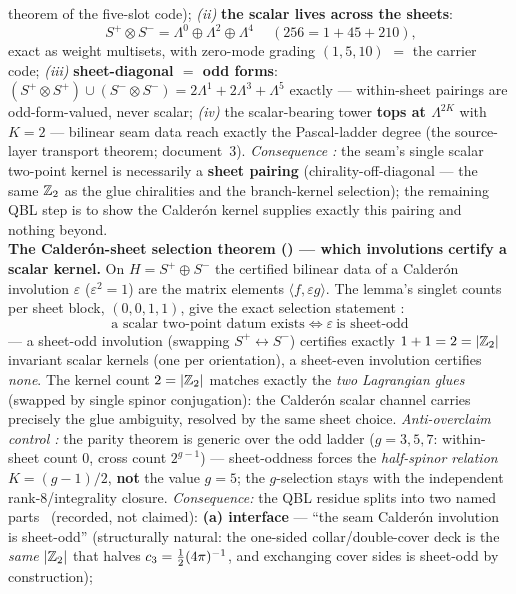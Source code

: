 \begin{keybox}
theorem of the five-slot code); \emph{(ii)} \textbf{the scalar lives across the sheets}:
\[
  \boxed{\ S^+\!\otimes S^-=\Lambda^0\oplus\Lambda^2\oplus\Lambda^4\ }\quad(256=1+45+210),
\]
exact as weight multisets, with zero-mode grading $(1,5,10)$ $=$ the carrier code; \emph{(iii)}
\textbf{sheet-diagonal $=$ odd forms}: $(S^+\!\otimes S^+)\cup(S^-\!\otimes S^-)=2\Lambda^1+2\Lambda^3+\Lambda^5$
exactly --- within-sheet pairings are odd-form-valued, never scalar; \emph{(iv)} the scalar-bearing tower
\textbf{tops at $\Lambda^{2K}$} with $K=2$ --- bilinear seam data reach exactly the Pascal-ladder degree
(the source-layer transport theorem; document~3). \emph{Consequence \mC:} the seam's single scalar two-point kernel is necessarily a
\textbf{sheet pairing} (chirality-off-diagonal --- the same $\mathbb{Z}_2$ as the glue chiralities and the
branch-kernel selection); the remaining QBL step is to show the Calder\'on kernel supplies exactly this
pairing and nothing beyond.
\smallskip\\
\noindent\textbf{The Calder\'on-sheet selection theorem () --- which
involutions certify a scalar kernel.} On $H=S^+\!\oplus S^-$ the certified bilinear data of a Calder\'on
involution $\varepsilon$ ($\varepsilon^2=1$) are the matrix elements $\langle f,\varepsilon g\rangle$.
The lemma's singlet counts per sheet block, $(0,0,1,1)$, give the exact selection statement \mE:
\[
  \boxed{\ \text{a scalar two-point datum exists}\iff\varepsilon\ \text{is sheet-odd}\ }
\]
--- a sheet-odd involution (swapping $S^+\!\leftrightarrow S^-$) certifies exactly $1+1=2=|\mathbb{Z}_2|$
invariant scalar kernels (one per orientation), a sheet-even involution certifies \emph{none}. The
kernel count $2=|\mathbb{Z}_2|$ matches exactly the \emph{two Lagrangian glues} (swapped by single spinor
conjugation): the Calder\'on scalar channel carries precisely the glue ambiguity, resolved by the same
sheet choice. \emph{Anti-overclaim control \mE:} the parity theorem is generic over the odd ladder
($g=3,5,7$: within-sheet count $0$, cross count $2^{g-1}$) --- sheet-oddness forces the
\emph{half-spinor relation} $K=(g-1)/2$, \textbf{not} the value $g=5$; the $g$-selection stays with the
independent rank-$8$/integrality closure. \emph{Consequence:} the QBL residue splits into two named
parts \mC\ (recorded, not claimed): \textbf{(a) interface} --- ``the seam Calder\'on involution is
sheet-odd'' (structurally natural: the one-sided collar/double-cover deck is the \emph{same} $|\mathbb{Z}_2|$
that halves $c_3=\tfrac12(4\pi)^{-1}$, and exchanging cover sides is sheet-odd by construction);

\end{keybox}
